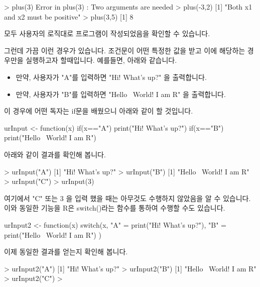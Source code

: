\documentclass{book}
\begin{document}
\begin{Schunk}
\begin{Soutput}
> plus(3)
Error in plus(3) : Two arguments are needed
> plus(-3,2)
[1] "Both x1 and x2 must be positive"
> plus(3,5)
[1] 8
\end{Soutput}
\end{Schunk}

모두 사용자의 로직대로 프로그램이 작성되었음을 확인할 수 있습니다. 


그런데 가끔 이런 경우가 있습니다. 
조건문이 어떤 특정한 값을 받고 이에 해당하는 경우만을 실행하고자 할때입니다. 
예를들면, 아래와 같습니다.

\begin{itemize}
\item 만약, 사용자가 "A"를 입력하면 "Hi! What's up?" 을 출력합니다.
\item 만약, 사용자가 "B"를 입력하면 "Hello~ World! I am R" 을 출력합니다.
\end{itemize}

이 경우에 어떤 독자는 if문을 배웠으니 아래와 같이 할 것입니다.

\begin{Schunk}
\begin{Soutput}
urInput <- function(x){
	if(x=="A") print("Hi! What's up?")
	if(x=="B") print("Hello~ World! I am R")
}
\end{Soutput}
\end{Schunk}

아래와 같이 결과를 확인해 봅니다. 
\begin{Schunk}
\begin{Soutput}
> urInput("A")
[1] "Hi! What's up?"
> urInput("B")
[1] "Hello~ World! I am R"
> urInput("C")
> urInput(3)
\end{Soutput}
\end{Schunk}

여기에서 "C" 또는 3 을 입력 했을 때는 아무것도 수행하지 않았음을 알 수 있습니다. 
이와 동일한 기능을 R은 switch()라는 함수를 통하여 수행할 수도 있습니다. 

\begin{Schunk}
\begin{Soutput}
urInput2 <- function(x){
	switch(x, 
		"A" = print("Hi! What's up?"),
		"B" = print("Hello~ World! I am R")
	)
}
\end{Soutput}
\end{Schunk}

이제 동일한 결과를 얻는지 확인해 봅니다. 

\begin{Schunk}
\begin{Soutput}
> urInput2("A")
[1] "Hi! What's up?"
> urInput2("B")
[1] "Hello~ World! I am R"
> urInput2("C")
>
\end{Soutput}
\end{Schunk}
\end{document}
